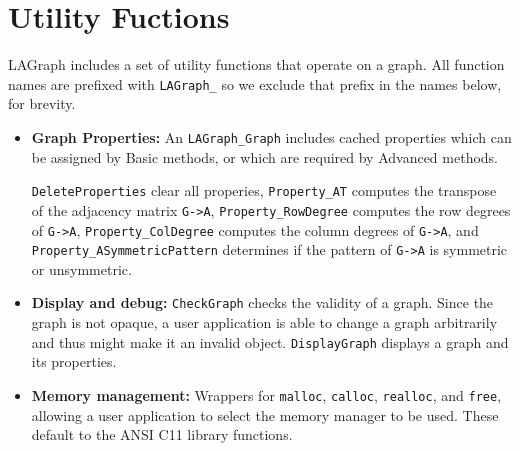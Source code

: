 \section{Utility Fuctions}
\label{sec:utility}

LAGraph includes a set of utility functions that operate
on a graph.  All function names are prefixed with \verb'LAGraph_'
so we exclude that prefix in the names below, for brevity.

\begin{itemize}

\item {\bf Graph Properties:}
    An \verb'LAGraph_Graph' includes cached properties which can be
    assigned by Basic methods, or which are required by Advanced methods.

      \verb'DeleteProperties' clear all properies,
      \verb'Property_AT' computes the transpose of the adjacency matrix \verb'G->A',
      \verb'Property_RowDegree' computes the row degrees of \verb'G->A',
      \verb'Property_ColDegree' computes the column degrees of \verb'G->A',
      and
      \verb'Property_ASymmetricPattern' determines if the pattern of \verb'G->A' is symmetric or unsymmetric.

\item {\bf Display and debug:}
    \verb'CheckGraph' checks the validity of a graph.
    Since the graph is not opaque, a user application is able to change a graph
    arbitrarily and thus might make it an invalid object.
    \verb'DisplayGraph' displays a graph and its properties.

\item {\bf Memory management:}
    Wrappers for \verb'malloc', \verb'calloc', \verb'realloc', and \verb'free',
    allowing a user application to select the memory manager to be used.
    These default to the ANSI C11 library functions.


\end{itemize}
